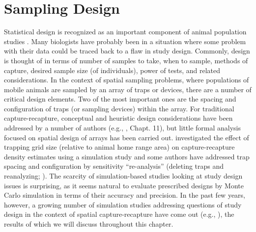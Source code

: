 \chapter{
Sampling Design
}
\label{chapt.design}

\vspace{.3in}



Statistical design is recognized as an important component of animal
population studies \citep{morrison_etal:2008,
  williams_etal:2002}. Many biologists have probably been in a
situation where some problem with their data could
be traced back to a flaw in study design.  Commonly, design is
thought of in terms of number of samples to take, when to sample,
methods of capture, desired sample size (of individuals), power of
tests, and related considerations.  In the context of spatial sampling
problems, where populations of mobile animals are sampled by an array
of traps or devices, there are a number of critical design elements.
Two of the most important ones are the spacing and configuration of
traps (or sampling devices) within the array.  For traditional
capture-recapture, conceptual and heuristic design considerations have
been addressed by a number of authors (e.g.,
\citealp{nichols_karanth:2002}, Chapt. 11), but little formal analysis
focused on spatial design of arrays has been carried
out. \citet{bondrup-nielsen:1983} investigated the effect of trapping
grid size (relative to animal home range area) on capture-recapture
density estimates using a simulation study and some authors have
addressed trap spacing and configuration by sensitivity
``re-analysis'' (deleting traps and reanalyzing;
\citealp{wegge_etal:2004, tobler_etal:2008}). The scarcity of
simulation-based studies looking at study design issues is surprising,
as it seems natural to evaluate prescribed designs by Monte Carlo
simulation in terms of their accuracy and precision. In the past few
years, however, a growing number of simulation studies addressing
questions of study design in the context of spatial capture-recapture
have come out (e.g., \citet{marques_etal:2011, sollmann_etal:2012,
  efford_fewster:2012, efford:2011ecol}), the results of which we will
discuss throughout this chapter.



